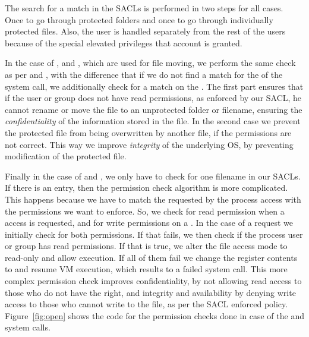 \par The search for a match in the \ac{SACL}s is performed in two steps for all cases. Once to go through protected folders and once to go through individually protected files. Also, the  user is handled separately from the rest of the users because of the special elevated privileges that account is granted. 

\par In the case of ,  and , which are used for file moving, we perform the same check as per  and , with the difference that if we do not find a match for the  of the system call, we additionally check for a match on the . The first part ensures that if the user or group does not have read permissions, as enforced by our \ac{SACL}, he cannot rename or move the file to an unprotected folder or filename, ensuring the \emph{confidentiality} of the information stored in the file. In the second case we prevent the protected file from being overwritten by another file, if the permissions are not correct. This way we improve \emph{integrity} of the underlying \ac{OS}, by preventing modification of the protected file. 

\par Finally in the case of  and , we only have to check for one filename in our \ac{SACL}s. If there is an entry, then the permission check algorithm is more complicated. This happens because we have to match the requested by the process access  with the permissions we want to enforce. So, we check for read permission when a  access is requested, and for write permissions on a . In the case of a  request we initially check for both permissions. If that fails, we then check if the process user or group has read permissions. If that is true, we alter the file access mode to read-only and allow execution. If all of them fail we change the  register contents to  and resume \ac{VM} execution, which results to a failed system call. This more complex permission check improves confidentiality, by not allowing read access to those who do not have the right, and integrity and availability by denying write access to those who cannot write to the file, as per the \ac{SACL} enforced policy. Figure~\ref{fig:open} shows the code for the permission checks done in case of the  and  system calls.




